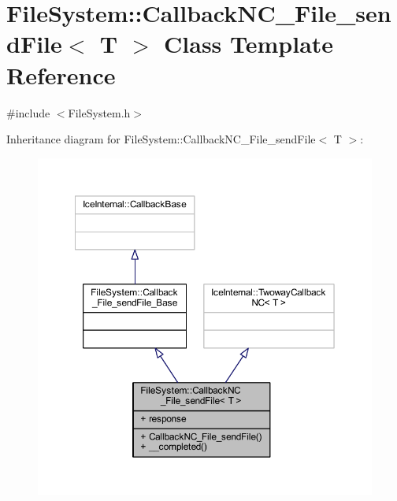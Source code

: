 \hypertarget{class_file_system_1_1_callback_n_c___file__send_file}{}\section{File\+System\+:\+:Callback\+N\+C\+\_\+\+File\+\_\+send\+File$<$ T $>$ Class Template Reference}
\label{class_file_system_1_1_callback_n_c___file__send_file}


{\ttfamily \#include $<$File\+System.\+h$>$}



Inheritance diagram for File\+System\+:\+:Callback\+N\+C\+\_\+\+File\+\_\+send\+File$<$ T $>$\+:
\nopagebreak
\begin{figure}[H]
\begin{center}
\leavevmode
\includegraphics[width=350pt]{class_file_system_1_1_callback_n_c___file__send_file__inherit__graph}
\end{center}
\end{figure}


